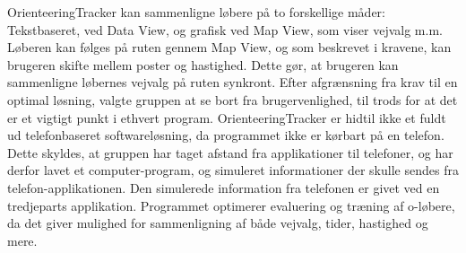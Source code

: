 OrienteeringTracker kan sammenligne løbere på to forskellige måder: Tekstbaseret, ved Data View, og grafisk ved Map View, som viser vejvalg m.m. \newline
Løberen kan følges på ruten gennem Map View, og som beskrevet i kravene, kan brugeren skifte mellem poster og hastighed. Dette gør, at brugeren kan sammenligne løbernes vejvalg på ruten synkront.
Efter afgrænsning fra krav til en optimal løsning, valgte gruppen at se bort fra brugervenlighed, til trods for at det er et vigtigt punkt i ethvert program.\newline
OrienteeringTracker er hidtil ikke et fuldt ud telefonbaseret softwareløsning, da programmet ikke er kørbart på en telefon. Dette skyldes, at gruppen har taget afstand fra applikationer til telefoner, og har derfor lavet et computer-program, og simuleret informationer der skulle sendes fra telefon-applikationen. Den simulerede information fra telefonen er givet ved en tredjeparts applikation.\newline
Programmet optimerer evaluering og træning af o-løbere, da det giver mulighed for sammenligning af både vejvalg, tider, hastighed og mere.